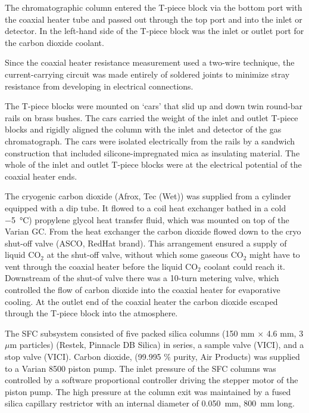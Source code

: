 \documentclass[aip,rsi,preprint,graphicx]{revtex4-1} %
\begin{document}
The chromatographic column entered the T-piece block via the bottom port with the
coaxial heater tube and passed out through the top port and into the inlet or
detector. In the left-hand side of the T-piece block was the inlet or outlet port for the
carbon dioxide coolant.


Since the coaxial heater resistance measurement used a two-wire technique, the
current-carrying circuit was made entirely of soldered joints to minimize stray
resistance from developing in electrical connections.

The T-piece blocks were mounted on `cars' that slid up and down twin round-bar
rails on brass bushes. The cars carried the weight of the inlet and outlet
T-piece blocks and rigidly aligned the column with the inlet and detector of the
gas chromatograph. The cars were isolated electrically from the rails by a
sandwich construction that included silicone-impregnated mica as insulating material. The
whole of the inlet and outlet T-piece blocks were at the electrical potential of
the coaxial heater ends.

The cryogenic carbon dioxide (Afrox, Tec (Wet)) was supplied from a cylinder
equipped with a dip tube. It flowed to a coil heat exchanger bathed in a cold
\SI{-5}{\celsius}) propylene glycol heat transfer fluid, which was mounted on
top of the Varian GC. From the heat exchanger the carbon dioxide flowed down to
the cryo shut-off valve (ASCO, RedHat brand). This arrangement ensured a supply
of liquid CO$_2$ at the shut-off valve, without which some gaseous CO$_2$ might
have to vent through the coaxial heater before the liquid CO$_2$ coolant could
reach it. Downstream of the shut-of valve there was a 10-turn metering valve,
which controlled the flow of carbon dioxide into the coaxial heater for
evaporative cooling. At the outlet end of the coaxial heater the carbon dioxide
escaped through the T-piece block into the atmosphere.

The SFC subsystem consisted of five packed silica columns (150 mm × 4.6
mm, 3 $\mu$m particles) (Restek, Pinnacle DB Silica) in series, a sample valve
(VICI), and a stop valve (VICI). Carbon dioxide, (99.995 \% purity, Air
Products) was supplied to a Varian 8500 piston pump. The inlet pressure of the
SFC columns was controlled by a software proportional controller driving the
stepper motor of the piston pump. The high pressure at the column exit was
maintained by a fused silica capillary restrictor with an internal diameter of
\SI{0.050}{\milli\metre}, \SI{800}{\milli\metre} long.
\end{document}
